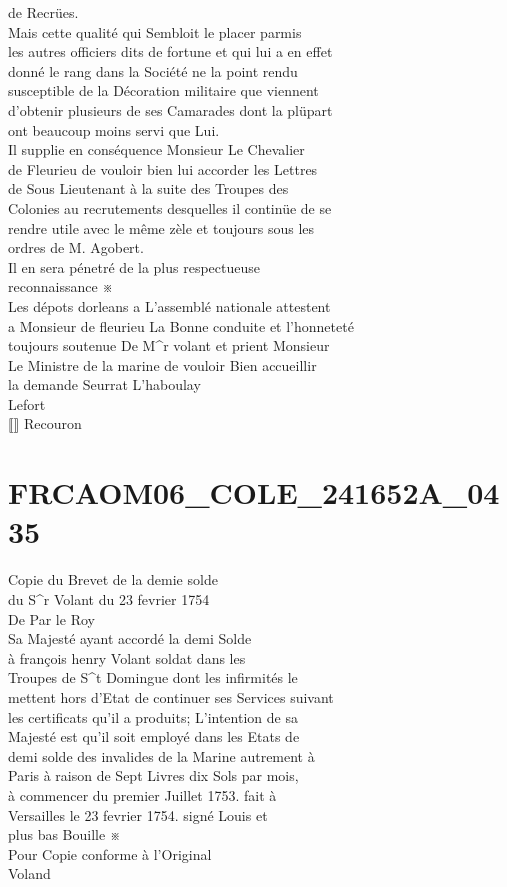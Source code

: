 \documentclass{article}
\begin{document}
\begin{pages}
de Recrües.\\
Mais cette qualité qui Sembloit le placer parmis\\
les autres officiers dits de fortune et qui lui a en effet\\
donné le rang dans la Société ne la point rendu\\
susceptible de la Décoration militaire que viennent\\
d'obtenir plusieurs de ses Camarades dont la plüpart\\
ont beaucoup moins servi que Lui.\\
Il supplie en conséquence Monsieur Le Chevalier\\
de Fleurieu de vouloir bien lui accorder les Lettres\\
de Sous Lieutenant à la suite des Troupes des\\
Colonies au recrutements desquelles il continüe de se\\
rendre utile avec le même zèle et toujours sous les\\
ordres de M. Agobert.\\
Il en sera pénetré de la plus respectueuse\\
reconnaissance ※\\
Les dépots dorleans a L'assemblé nationale attestent\\
a Monsieur de fleurieu La Bonne conduite et l'honneteté\\
toujours soutenue De M\^{}r volant et prient Monsieur\\
Le Ministre de la marine de vouloir Bien accueillir\\
la demande Seurrat L'haboulay\\
Lefort\\
⟦⟧ Recouron
\pend
\endnumbering\beginnumbering\section{FRCAOM06\_COLE\_241652A\_0435}\pstart
Copie du Brevet de la demie solde\\
du S\^{}r Volant du 23 fevrier 1754\\
De Par le Roy\\
Sa Majesté ayant accordé la demi Solde\\
à françois henry Volant soldat dans les\\
Troupes de S\^{}t Domingue dont les infirmités le\\
mettent hors d'Etat de continuer ses Services suivant\\
les certificats qu'il a produits; L'intention de sa\\
Majesté est qu'il soit employé dans les Etats de\\
demi solde des invalides de la Marine autrement à\\
Paris à raison de Sept Livres dix Sols par mois,\\
à commencer du premier Juillet 1753. fait à\\
Versailles le 23 fevrier 1754. signé Louis et\\
plus bas Bouille ※\\
Pour Copie conforme à l'Original\\
Voland
\pend
\endnumbering
\end{pages}
\end{document}
